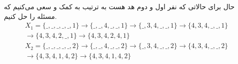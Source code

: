 \begin{enumerate}
    حال برای حالاتی که نفر اول و دوم هد هست به ترتیب به کمک  و  سعی می‌کنیم که مسئله را حل کنیم.
    \begin{gather*}
        X_1 = \{\_,\_,\_,\_,\_,1\} \rightarrow \{\_,\_,4,\_,\_,1\} \rightarrow \{\_,3,4,\_,\_,1\} \rightarrow \{4,3,4,\_,\_,1\} \\
        \rightarrow \{4,3,4,2,\_,1\} \rightarrow \{4,3,4,2,4,1\}\\
        X_2 = \{\_,\_,\_,\_,\_,2\} \rightarrow \{\_,\_,4,\_,\_,2\} \rightarrow \{\_,3,4,\_,\_,2\} \rightarrow \{4,3,4,\_,\_,2\} \\
        \rightarrow \{4,3,4,1,4,2\} \rightarrow \{4,3,4,1,4,2\}
    \end{gather*}
\end{enumerate}








